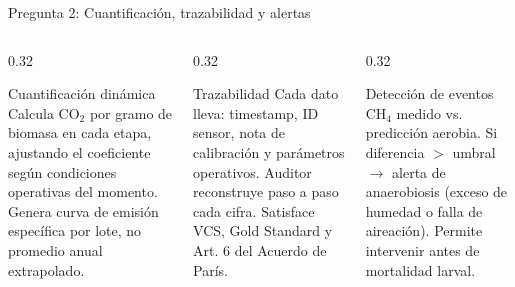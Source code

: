 \documentclass[aspectratio=169, 11pt]{beamer}
\begin{document}
\begin{frame}{Pregunta 2: Cuantificación, trazabilidad y alertas}
\begin{columns}[T]
\begin{column}{0.32\textwidth}
\begin{block}{Cuantificación dinámica}
\footnotesize
Calcula CO$_2$ por gramo de biomasa en cada etapa, ajustando el coeficiente según condiciones operativas del momento. Genera curva de emisión específica por lote, no promedio anual extrapolado.
\end{block}
\end{column}
\begin{column}{0.32\textwidth}
\begin{block}{Trazabilidad}
\footnotesize
Cada dato lleva: timestamp, ID sensor, nota de calibración y parámetros operativos. Auditor reconstruye paso a paso cada cifra. Satisface VCS, Gold Standard y Art. 6 del Acuerdo de París.
\end{block}
\end{column}
\begin{column}{0.32\textwidth}
\begin{alertblock}{Detección de eventos}
\footnotesize
CH$_4$ medido vs. predicción aerobia. Si diferencia $>$ umbral $\rightarrow$ alerta de anaerobiosis (exceso de humedad o falla de aireación). Permite intervenir antes de mortalidad larval.
\end{alertblock}
\end{column}
\end{columns}
\end{frame}
\end{document}
